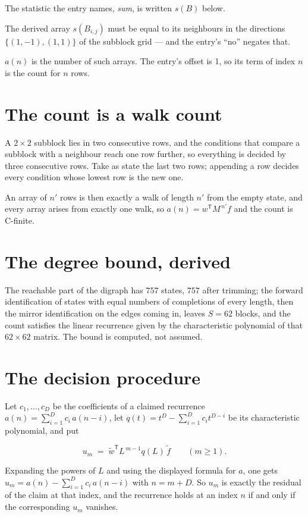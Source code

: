\documentclass[11pt]{article}
\theoremstyle{definition}
\begin{document}
The statistic the entry names, {\itshape sum}, is written $s(B)$ below.

The derived array $s(B_{i,j})$ must be equal to its neighbours in the directions $\{(1,-1), (1,1)\}$ of the subblock grid --- and the entry's ``no'' negates that.

$a(n)$ is the number of such arrays. The entry's offset is 1, so its term of index $n$ is the count for $n$ rows.

\section{The count is a walk count}

A $2\times2$ subblock lies in two consecutive rows, and the conditions that compare a subblock with a neighbour reach one row further, so everything is decided by three consecutive rows. Take as state the last two rows; appending a row decides every condition whose lowest row is the new one.

An array of $n'$ rows is then exactly a walk of length $n'$ from the empty state, and every array arises from exactly one walk, so $a(n) = w^{\mathsf T}M^{\,n'}f$ and the count is C-finite.

\section{The degree bound, derived}

The reachable part of the digraph has $757$ states, $757$ after trimming; the forward identification of states with equal numbers of completions of every length, then the mirror identification on the edges coming in, leaves $S = 62$ blocks, and the count satisfies the linear recurrence given by the characteristic polynomial of that $62\times62$ matrix. The bound is computed, not assumed.

\section{The decision procedure}

Let $c_1,\dots,c_D$ be the coefficients of a claimed recurrence $a(n) = \sum_{i=1}^{D} c_i\,a(n-i)$, let $q(t) = t^{D} - \sum_{i=1}^{D} c_i t^{D-i}$ be its characteristic polynomial, and put

\[u_m \;=\; \tilde w^{\mathsf T} L^{\,m-1} q(L)\,\tilde f \qquad (m \ge 1).\]

Expanding the powers of $L$ and using the displayed formula for $a$, one gets $u_m = a(n) - \sum_{i=1}^{D} c_i\,a(n-i)$ with $n = m + D$. So $u_m$ is exactly the residual of the claim at that index, and the recurrence holds at an index $n$ if and only if the corresponding $u_m$ vanishes.
\end{document}
